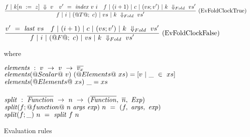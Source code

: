 \begin{figure*}
$$
\frac {\displaystyle 
    f ~|~ k[n~:=~z] ~\Downarrow~ v
    \quad
    v'~=~\mathit{index}~v~i
    \quad
f~|~(i+1)~|~c~|~(vs;v')~|~k~\Downarrow_{Fold}~vs'
} {\displaystyle 
f~|~i~|~(@T@;~c)~|~vs~|~k~\Downarrow_{Fold}~vs'
} \ 
\textrm{(EvFoldClockTrue)}
$$

$$
\frac {\displaystyle 
    v'~=~\mathit{last}~vs
    \quad
f~|~(i+1)~|~c~|~(vs;v')~|~k~\Downarrow_{Fold}~vs'
} {\displaystyle 
f~|~i~|~(@F@;~c)~|~vs~|~k~\Downarrow_{Fold}~vs'
} \ 
\textrm{(EvFoldClockFalse)}
$$




where
\begin{tabbing}
$\mathit{elements}~:~v~\to~v~\to~\overline{v_x}$\\
$\mathit{elements} (@Scalar@~v)~(@Elements@~xs) = [v~|~\_~\in~xs]$\\
$\mathit{elements} (@Elements@~xs)~\_ = xs$\\
\\
$\mathit{split}~:~\overline{\mathit{Function}}~\to~n~\to~(\overline{\mathit{Function}},~\overline{n},~\mathit{Exp})$\\
$\mathit{split} (f;@function@~n~\mathit{args}~\mathit{exp})~n~=~(f,~\mathit{args},~\mathit{exp})$ \\
$\mathit{split} (f;\_)~n~=~\mathit{split}~f~n$ \\
\end{tabbing}

\caption{Evaluation rules}
\label{fig:source:eval}
\end{figure*}


